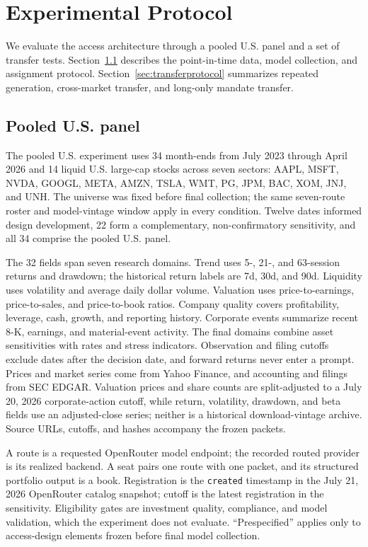 \documentclass[sigconf]{acmart}
\begin{document}
\section{Experimental Protocol}\label{sec:protocol}
We evaluate the access architecture through a pooled U.S. panel and a set of transfer tests. Section~\ref{sec:primaryprotocol} describes the point-in-time data, model collection, and assignment protocol. Section~\ref{sec:transferprotocol} summarizes repeated generation, cross-market transfer, and long-only mandate transfer.

\subsection{Pooled U.S. panel}\label{sec:primaryprotocol}
The pooled U.S. experiment uses 34 month-ends from July 2023 through April 2026 and 14 liquid U.S. large-cap stocks across seven sectors: AAPL, MSFT, NVDA, GOOGL, META, AMZN, TSLA, WMT, PG, JPM, BAC, XOM, JNJ, and UNH. The universe was fixed before final collection; the same seven-route roster and model-vintage window apply in every condition. Twelve dates informed design development, 22 form a complementary, non-confirmatory sensitivity, and all 34 comprise the pooled U.S. panel.

The 32 fields span seven research domains. Trend uses 5-, 21-, and 63-session returns and drawdown; the historical return labels are 7d, 30d, and 90d. Liquidity uses volatility and average daily dollar volume. Valuation uses price-to-earnings, price-to-sales, and price-to-book ratios. Company quality covers profitability, leverage, cash, growth, and reporting history. Corporate events summarize recent 8-K, earnings, and material-event activity. The final domains combine asset sensitivities with rates and stress indicators. Observation and filing cutoffs exclude dates after the decision date, and forward returns never enter a prompt. Prices and market series come from Yahoo Finance, and accounting and filings from SEC EDGAR. Valuation prices and share counts are split-adjusted to a July 20, 2026 corporate-action cutoff, while return, volatility, drawdown, and beta fields use an adjusted-close series; neither is a historical download-vintage archive. Source URLs, cutoffs, and hashes accompany the frozen packets.

A route is a requested OpenRouter model endpoint; the recorded routed provider is its realized backend. A seat pairs one route with one packet, and its structured portfolio output is a book. Registration is the \texttt{created} timestamp in the July 21, 2026 OpenRouter catalog snapshot; cutoff is the latest registration in the sensitivity. Eligibility gates are investment quality, compliance, and model validation, which the experiment does not evaluate. ``Prespecified'' applies only to access-design elements frozen before final model collection.
\end{document}
